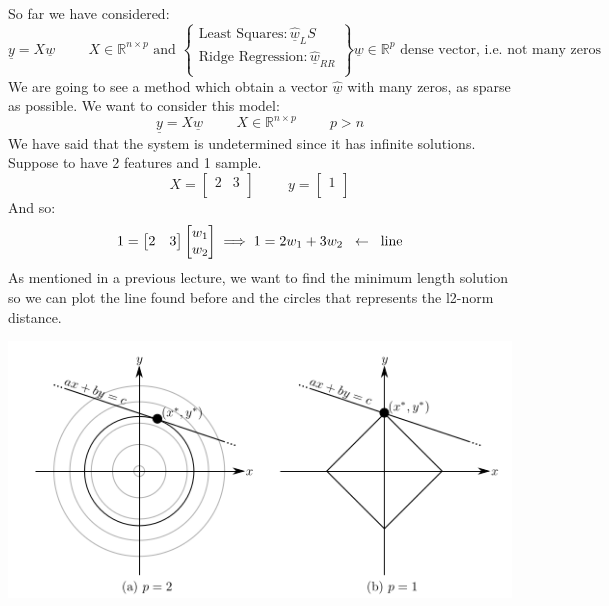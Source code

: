 So far we have considered:
\[
    \underline{y} = X\underline{w} \hspace{1cm} X \in \mathbb{R}^{n \times p} \text{ and } \begin{Bmatrix}
        \text{Least Squares}: \underline{\hat{w}}_LS\\
        \text{Ridge Regression}: \underline{\hat{w}}_{RR}\\
    \end{Bmatrix} \underline{w} \in \mathbb{R}^p \text{ dense vector, i.e. not many zeros} 
\]
We are going to see a method which obtain a vector $\underline{\hat{w}}$ with many zeros, as sparse as possible. We want to consider this model:
\[
    \underline{y} = X\underline{w} \hspace{1cm} X \in \mathbb{R}^{n \times p} \hspace{1cm} p > n 
\]
We have said that the system is undetermined since it has infinite solutions. Suppose to have 2 features and 1 sample. 
\[
    X = \begin{bmatrix}
        2 & 3\\
    \end{bmatrix}
    \hspace{1cm}
    y = \begin{bmatrix}
        1\\
    \end{bmatrix}
\]
And so:
\[
    1 = \begin{bmatrix}
        2 & 3
    \end{bmatrix}\begin{bmatrix}
        w_1\\
        w_2
    \end{bmatrix} \implies
    1 = 2w_1 + 3w_2 \hspace{0.2cm} \leftarrow \hspace{0.2cm} \text{line}    
\]
As mentioned in a previous lecture, we want to find the minimum length solution so we can plot the line found before and the circles that represents the l2-norm distance.
\begin{center}
    \includegraphics[scale=0.6]{../images/LassoRidgePlot.png}
\end{center}
